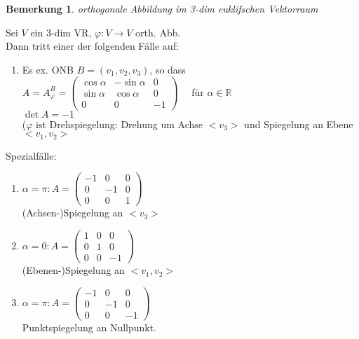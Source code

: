\documentclass[a4paper,11pt]{article}
\newtheorem{bem}[definition]{Bemerkung}
\begin{document}
\begin{bem}
	orthogonale Abbildung im 3-dim euklifschen Vektorraum
\end{bem}
Sei $V$ ein 3-dim VR, $\varphi\colon V\to V$ orth. Abb. \\
Dann tritt einer der folgenden Fälle auf: \\
\begin{enumerate}[label=\alph*)]
	\item Es ex. ONB $B=(v_1,v_2,v_3)$, so dass \\
	$A=A^B_\varphi=\begin{pmatrix}\cos\alpha & -\sin\alpha & 0 \\ \sin\alpha & \cos\alpha & 0 \\ 0 & 0 & -1\end{pmatrix}\quad$ für $\alpha\in\mathbb{R}$ \\
	$\det A=-1$ \\
	($\varphi$ ist Drehspiegelung: Drehung um Achse $<v_3>$ und Spiegelung an Ebene $<v_1,v_2>$
\end{enumerate}
Spezialfälle: 
\begin{enumerate}[label=\alph*)]
	\item $\alpha=\pi\colon A=\begin{pmatrix} -1 & 0 & 0 \\ 0 & -1 & 0 \\ 0 & 0 & 1\end{pmatrix}$ \\
	(Achsen-)Spiegelung an $<v_3>$
	\item $\alpha=0\colon A=\begin{pmatrix} 1 & 0 & 0 \\ 0 & 1 & 0 \\ 0 & 0 & -1\end{pmatrix}$ \\
	(Ebenen-)Spiegelung an $<v_1,v_2>$
	\item $\alpha=\pi\colon A=\begin{pmatrix} -1 & 0 & 0 \\ 0 & -1 & 0 \\ 0 & 0 & -1\end{pmatrix}$ \\
	Punktspiegelung an Nullpunkt.
\end{enumerate}

\newpage
\end{document}
